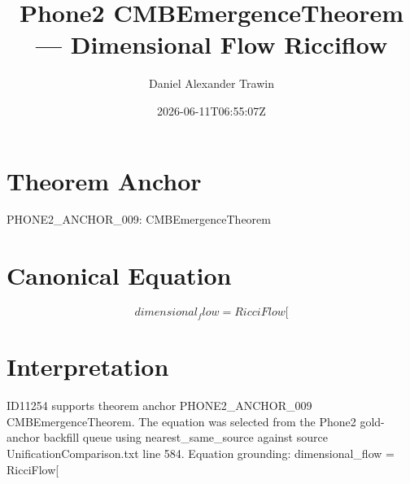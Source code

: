 \documentclass[11pt]{article}
\title{Phone2 CMBEmergenceTheorem — Dimensional Flow Ricciflow}
\author{Daniel Alexander Trawin}
\date{2026-06-11T06:55:07Z}
\begin{document}
\maketitle
\section*{Theorem Anchor}
PHONE2_ANCHOR_009: CMBEmergenceTheorem
\section*{Canonical Equation}
\[
dimensional_flow = RicciFlow[
\]
\section*{Interpretation}
ID11254 supports theorem anchor PHONE2_ANCHOR_009 CMBEmergenceTheorem. The equation was selected from the Phone2 gold-anchor backfill queue using nearest_same_source against source UnificationComparison.txt line 584. Equation grounding: dimensional_flow = RicciFlow[
\end{document}
